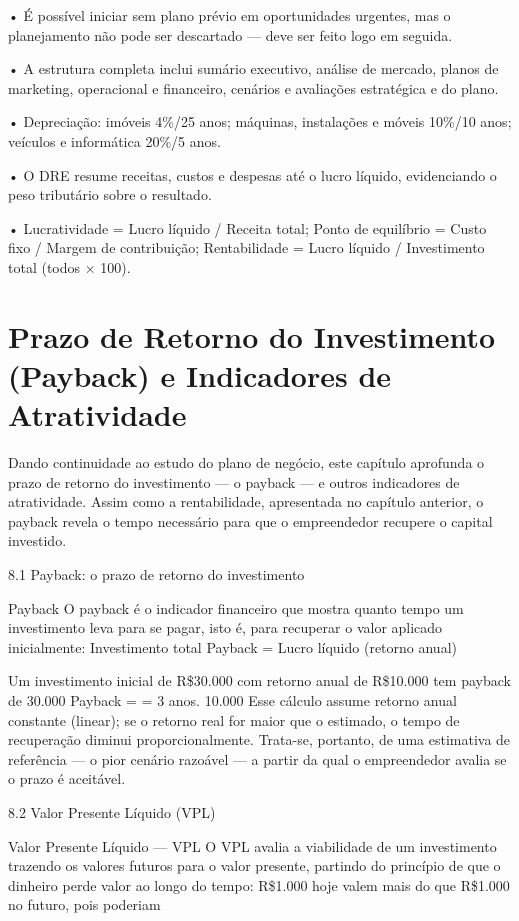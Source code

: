 • É possível iniciar sem plano prévio em oportunidades urgentes, mas o planejamento não pode ser descartado — deve ser feito logo em seguida.

• A estrutura completa inclui sumário executivo, análise de mercado, planos de marketing, operacional e financeiro, cenários e avaliações estratégica e do plano.

• Depreciação: imóveis 4\%/25 anos; máquinas, instalações e móveis 10\%/10 anos; veículos e informática 20\%/5 anos.

• O DRE resume receitas, custos e despesas até o lucro líquido, evidenciando o peso tributário sobre o resultado.

• Lucratividade = Lucro líquido / Receita total; Ponto de equilíbrio = Custo fixo / Margem de contribuição; Rentabilidade = Lucro líquido / Investimento total (todos × 100).

\chapter{Prazo de Retorno do Investimento (Payback) e Indicadores de Atratividade}

Dando continuidade ao estudo do plano de negócio, este capítulo aprofunda o prazo de retorno do investimento — o payback — e outros indicadores de atratividade. Assim como a rentabilidade, apresentada no capítulo anterior, o payback revela o tempo necessário para que o empreendedor recupere o capital investido.

8.1 Payback: o prazo de retorno do investimento

Payback O payback é o indicador financeiro que mostra quanto tempo um investimento leva para se pagar, isto é, para recuperar o valor aplicado inicialmente: Investimento total Payback = Lucro líquido (retorno anual)

Um investimento inicial de R\$30.000 com retorno anual de R\$10.000 tem payback de 30.000 Payback = = 3 anos. 10.000 Esse cálculo assume retorno anual constante (linear); se o retorno real for maior que o estimado, o tempo de recuperação diminui proporcionalmente. Trata-se, portanto, de uma estimativa de referência — o pior cenário razoável — a partir da qual o empreendedor avalia se o prazo é aceitável.

8.2 Valor Presente Líquido (VPL)

Valor Presente Líquido — VPL O VPL avalia a viabilidade de um investimento trazendo os valores futuros para o valor presente, partindo do princípio de que o dinheiro perde valor ao longo do tempo: R\$1.000 hoje valem mais do que R\$1.000 no futuro, pois poderiam

